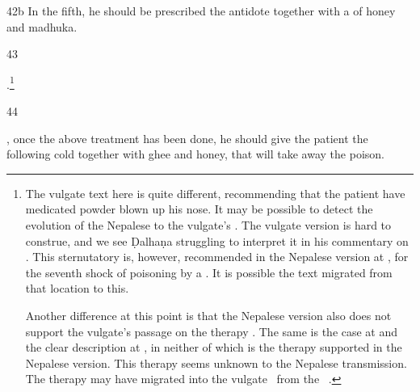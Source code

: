 \begin{translation}
    

    
    \item[42b]
    In the fifth, he should be prescribed the antidote together with a
     of honey and
    \gls{madhuka}.
   
   
    \item[43] 
    
    .\footnote{The
    vulgate text here is quite different, recommending that the
    patient have medicated powder blown up his nose. It may be
    possible to detect the evolution of the Nepalese  to
    the vulgate's .  The vulgate version is hard to
    construe, and we see Ḍalhaṇa struggling to interpret it in his
    commentary on .  This sternutatory is, however,
    recommended in the Nepalese version at , for the
    seventh shock of poisoning by a .  It
    is possible the text migrated from  that location to this.

\label{kakapada} Another difference at this point is that the Nepalese
version also does not support the vulgate's passage on the
 therapy \citep[145, n.\,106]{wuja-2003}.  The
same is the case at  and the clear description at
, in neither of which is the therapy supported in the
Nepalese version.  This therapy seems unknown to the Nepalese
transmission.  The therapy may have migrated into the vulgate \SS\ from
the \CS\ .}
    

%

\item[44] 

, once the above treatment
has been done, he should give the patient the following cold
 together with ghee and honey, that will take away
the poison.
       

\end{translation}

